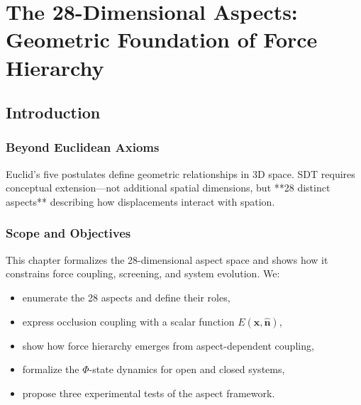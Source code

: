 \chapter{The 28-Dimensional Aspects: Geometric Foundation of Force Hierarchy}

\author{James Tyndall}
\date{December 2025}

\begin{abstract}
We extend Euclid's axiomatic framework to reveal the 28-dimensional geometric structure underlying Spatial Displacement Theory. These are not spatial dimensions but conceptual aspects describing displacement-spation interactions: 3 spatial coordinates, 3 displacement orientations, 3 toroidal circulation parameters, 3 occlusion directions, 4 system flow states (Φ₁-Φ₄), 4 geometric symmetries, 4 boundary conditions, and 4 temporal phases. From this structure emerges the force hierarchy (10³⁹ electromagnetic to gravitational ratio), the movement principle guiding systems toward configurations with more interaction choices, and the deterministic evolution equations Φ₄ and Φ₅ governing open vs closed system dynamics. We demonstrate how occlusion function E(x,n̂) determines force coupling strength across scales, derive the 10⁻⁹ to 10⁻¹²³ screening hierarchy, and propose three experiments testing the 28-dimensional structure including anisotropy detection, Φ-state measurement, and choice-gradient verification.
\end{abstract}

\section{Introduction}

\subsection{Beyond Euclidean Axioms}

Euclid's five postulates define geometric relationships in 3D space. SDT requires conceptual extension—not additional spatial dimensions, but **28 distinct aspects** describing how displacements interact with spation.

\subsection{Scope and Objectives}
This chapter formalizes the 28-dimensional aspect space and shows how it constrains force coupling, screening, and system evolution. We:
\begin{itemize}
\item enumerate the 28 aspects and define their roles,
\item express occlusion coupling with a scalar function $E(\mathbf{x}, \hat{\mathbf{n}})$,
\item show how force hierarchy emerges from aspect-dependent coupling,
\item formalize the $\Phi$-state dynamics for open and closed systems,
\item propose three experimental tests of the aspect framework.
\end{itemize}

